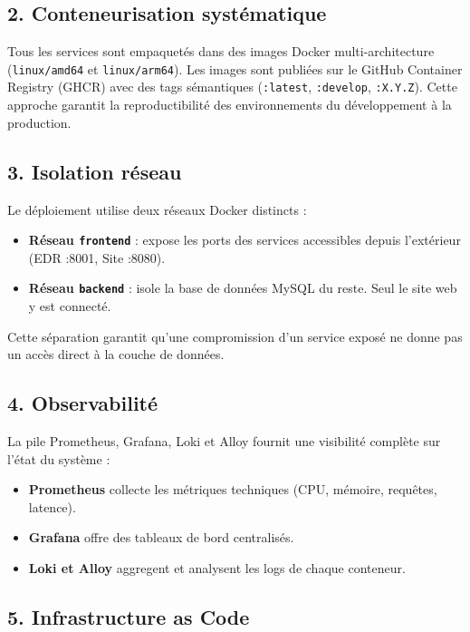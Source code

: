 \subsection*{2. Conteneurisation systématique}

Tous les services sont empaquetés dans des images Docker multi-architecture
(\texttt{linux/amd64} et \texttt{linux/arm64}). Les images sont publiées
sur le GitHub Container Registry (GHCR) avec des tags sémantiques
(\texttt{:latest}, \texttt{:develop}, \texttt{:X.Y.Z}). Cette approche
garantit la reproductibilité des environnements du développement à la
production.

\subsection*{3. Isolation réseau}

Le déploiement utilise deux réseaux Docker distincts :
\begin{itemize}
  \item \textbf{Réseau \texttt{frontend}} : expose les ports des services
    accessibles depuis l'extérieur (EDR :8001, Site :8080).
  \item \textbf{Réseau \texttt{backend}} : isole la base de données MySQL
    du reste. Seul le site web y est connecté.
\end{itemize}
Cette séparation garantit qu'une compromission d'un service exposé ne donne
pas un accès direct à la couche de données.

\subsection*{4. Observabilité}

La pile Prometheus, Grafana, Loki et Alloy fournit une visibilité complète
sur l'état du système :
\begin{itemize}
  \item \textbf{Prometheus} collecte les métriques techniques (CPU, mémoire,
    requêtes, latence).
  \item \textbf{Grafana} offre des tableaux de bord centralisés.
  \item \textbf{Loki et Alloy} aggregent et analysent les logs de chaque
    conteneur.
\end{itemize}

\subsection*{5. Infrastructure as Code}

